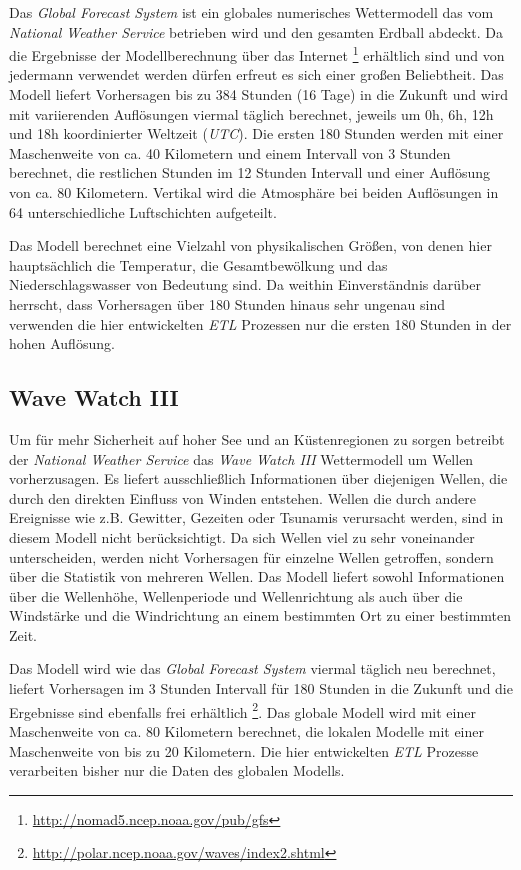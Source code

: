 Das \textit{Global Forecast System} ist ein globales numerisches
Wettermodell das vom \textit{National Weather Service} betrieben wird
und den gesamten Erdball abdeckt. Da die Ergebnisse der
Modellberechnung über das Internet
\footnote{\url{http://nomad5.ncep.noaa.gov/pub/gfs}} erhältlich sind
und von jedermann verwendet werden dürfen erfreut es sich einer großen
Beliebtheit. Das Modell liefert Vorhersagen bis zu 384 Stunden (16
Tage) in die Zukunft und wird mit variierenden Auflösungen viermal
täglich berechnet, jeweils um 0h, 6h, 12h und 18h koordinierter
Weltzeit (\textit{UTC}). Die ersten 180 Stunden werden mit einer
Maschenweite von ca. 40 Kilometern und einem Intervall von 3 Stunden
berechnet, die restlichen Stunden im 12 Stunden Intervall und einer
Auflösung von ca. 80 Kilometern. Vertikal wird die Atmosphäre bei
beiden Auflösungen in 64 unterschiedliche Luftschichten aufgeteilt.

Das Modell berechnet eine Vielzahl von physikalischen Größen, von
denen hier hauptsächlich die Temperatur, die Gesamtbewölkung und das
Niederschlagswasser von Bedeutung sind. Da weithin Einverständnis
darüber herrscht, dass Vorhersagen über 180 Stunden hinaus sehr
ungenau sind verwenden die hier entwickelten \textit{ETL} Prozessen
nur die ersten 180 Stunden in der hohen Auflösung.

\subsection{Wave Watch III}

Um für mehr Sicherheit auf hoher See und an Küstenregionen zu sorgen
betreibt der \textit{National Weather Service} das \textit{Wave Watch
  III} Wettermodell um Wellen vorherzusagen. Es liefert ausschließlich
Informationen über diejenigen Wellen, die durch den direkten Einfluss
von Winden entstehen. Wellen die durch andere Ereignisse wie
z.B. Gewitter, Gezeiten oder Tsunamis verursacht werden, sind in
diesem Modell nicht berücksichtigt. Da sich Wellen viel zu sehr
voneinander unterscheiden, werden nicht Vorhersagen für einzelne
Wellen getroffen, sondern über die Statistik von mehreren Wellen. Das
Modell liefert sowohl Informationen über die Wellenhöhe, Wellenperiode
und Wellenrichtung als auch über die Windstärke und die Windrichtung
an einem bestimmten Ort zu einer bestimmten Zeit.

Das Modell wird wie das \textit{Global Forecast System} viermal
täglich neu berechnet, liefert Vorhersagen im 3 Stunden Intervall für
180 Stunden in die Zukunft und die Ergebnisse sind ebenfalls frei
erhältlich
\footnote{\url{http://polar.ncep.noaa.gov/waves/index2.shtml}}. Das
globale Modell wird mit einer Maschenweite von ca. 80 Kilometern
berechnet, die lokalen Modelle mit einer Maschenweite von bis zu 20
Kilometern. Die hier entwickelten \textit{ETL} Prozesse verarbeiten
bisher nur die Daten des globalen Modells.

